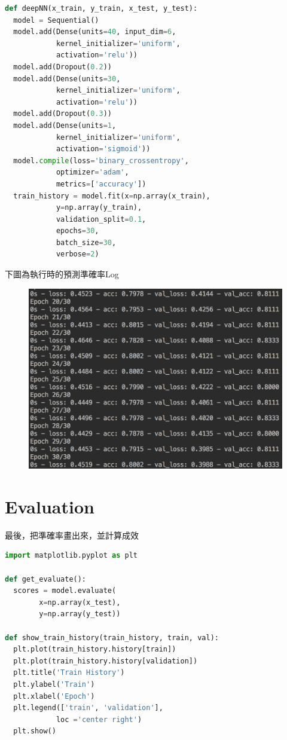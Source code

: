 \documentclass[12pt,a4paper]{article}
\begin{document}
{\begin{shaded}
\begin{lstlisting}[language=Python]
def deepNN(x_train, y_train, x_test, y_test):
  model = Sequential()
  model.add(Dense(units=40, input_dim=6, 
  			kernel_initializer='uniform', 
  			activation='relu'))
  model.add(Dropout(0.2))
  model.add(Dense(units=30, 
  			kernel_initializer='uniform', 
  			activation='relu'))
  model.add(Dropout(0.3))
  model.add(Dense(units=1, 
  			kernel_initializer='uniform', 
  			activation='sigmoid'))
  model.compile(loss='binary_crossentropy', 
  			optimizer='adam', 
  			metrics=['accuracy'])
  train_history = model.fit(x=np.array(x_train), 
  			y=np.array(y_train), 
  			validation_split=0.1, 
  			epochs=30,
  			batch_size=30, 
  			verbose=2)
\end{lstlisting}
\end{shaded}

下圖為執行時的預測準確率Log
\begin{figure}[ht]
\centering
\includegraphics[width=1.0\textwidth]{image/acc.png}
\end{figure}

\newpage
\section{Evaluation}
最後，把準確率畫出來，並計算成效

\begin{shaded}
\begin{lstlisting}[language=Python]
import matplotlib.pyplot as plt

def get_evaluate():
  scores = model.evaluate(
  		x=np.array(x_test), 
  		y=np.array(y_test))

def show_train_history(train_history, train, val):
  plt.plot(train_history.history[train])
  plt.plot(train_history.history[validation])
  plt.title('Train History')
  plt.ylabel('Train')
  plt.xlabel('Epoch')
  plt.legend(['train', 'validation'], 
  			loc ='center right')
  plt.show()
\end{lstlisting}
\end{shaded}

}
\end{document}
